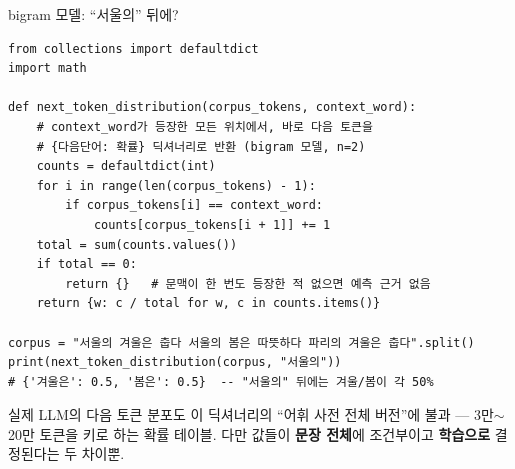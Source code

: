 \documentclass[aspectratio=169,11pt]{beamer}
\begin{document}
\begin{frame}[fragile]{bigram 모델: ``서울의'' 뒤에?}
\begin{lstlisting}
from collections import defaultdict
import math

def next_token_distribution(corpus_tokens, context_word):
    # context_word가 등장한 모든 위치에서, 바로 다음 토큰을
    # {다음단어: 확률} 딕셔너리로 반환 (bigram 모델, n=2)
    counts = defaultdict(int)
    for i in range(len(corpus_tokens) - 1):
        if corpus_tokens[i] == context_word:
            counts[corpus_tokens[i + 1]] += 1
    total = sum(counts.values())
    if total == 0:
        return {}   # 문맥이 한 번도 등장한 적 없으면 예측 근거 없음
    return {w: c / total for w, c in counts.items()}

corpus = "서울의 겨울은 춥다 서울의 봄은 따뜻하다 파리의 겨울은 춥다".split()
print(next_token_distribution(corpus, "서울의"))
# {'겨울은': 0.5, '봄은': 0.5}  -- "서울의" 뒤에는 겨울/봄이 각 50%
\end{lstlisting}
  {\footnotesize 실제 LLM의 다음 토큰 분포도 이 딕셔너리의
  ``어휘 사전 전체 버전''에 불과 --- 3만$\sim$20만 토큰을 키로
  하는 확률 테이블. 다만 값들이 \textbf{문장 전체}에 조건부이고
  \textbf{학습으로} 결정된다는 두 차이뿐.}
\end{frame}
\end{document}

